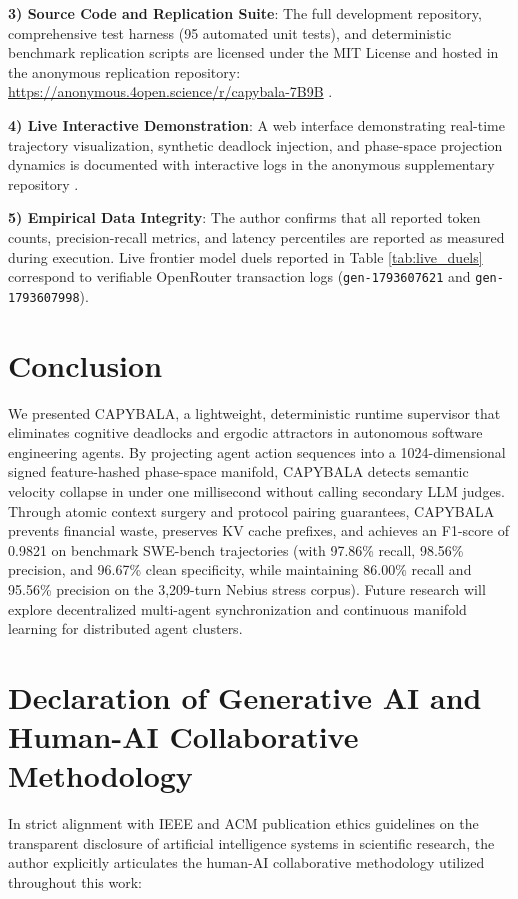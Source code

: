 \documentclass[journal]{IEEEtran}
\begin{document}
\textbf{3) Source Code and Replication Suite}: The full development repository, comprehensive test harness (95 automated unit tests), and deterministic benchmark replication scripts are licensed under the MIT License and hosted in the anonymous replication repository: \url{https://anonymous.4open.science/r/capybala-7B9B} \cite{capybala_github_2026}.

\textbf{4) Live Interactive Demonstration}: A web interface demonstrating real-time trajectory visualization, synthetic deadlock injection, and phase-space projection dynamics is documented with interactive logs in the anonymous supplementary repository \cite{capybala_render_2026}.

\textbf{5) Empirical Data Integrity}: The author confirms that all reported token counts, precision-recall metrics, and latency percentiles are reported as measured during execution. Live frontier model duels reported in Table \ref{tab:live_duels} correspond to verifiable OpenRouter transaction logs (\texttt{gen-1793607621} and \texttt{gen-1793607998}).

\section{Conclusion}

We presented CAPYBALA, a lightweight, deterministic runtime supervisor that eliminates cognitive deadlocks and ergodic attractors in autonomous software engineering agents. By projecting agent action sequences into a 1024-dimensional signed feature-hashed phase-space manifold, CAPYBALA detects semantic velocity collapse in under one millisecond without calling secondary LLM judges. Through atomic context surgery and protocol pairing guarantees, CAPYBALA prevents financial waste, preserves KV cache prefixes, and achieves an F1-score of 0.9821 on benchmark SWE-bench trajectories (with 97.86\% recall, 98.56\% precision, and 96.67\% clean specificity, while maintaining 86.00\% recall and 95.56\% precision on the 3,209-turn Nebius stress corpus). Future research will explore decentralized multi-agent synchronization and continuous manifold learning for distributed agent clusters.

\section*{Declaration of Generative AI and Human-AI Collaborative Methodology}
In strict alignment with IEEE and ACM publication ethics guidelines on the transparent disclosure of artificial intelligence systems in scientific research, the author explicitly articulates the human-AI collaborative methodology utilized throughout this work:
\end{document}
